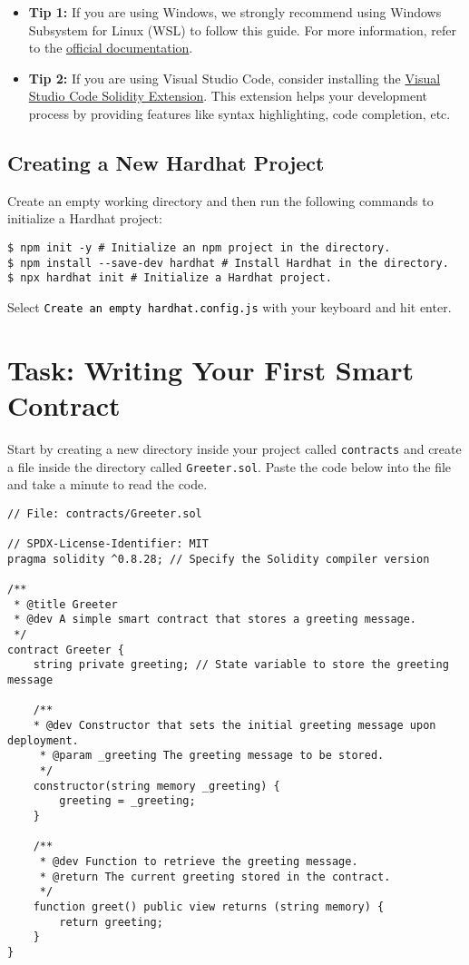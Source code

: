 \documentclass[12pt]{article}
\newcommand{\codegrey}[1]{%
  \texttt{\colorbox{black!4}{\textcolor{black}{#1}}}%
}
\begin{document}
\begin{itemize}
    \item \textbf{Tip 1:} If you are using Windows, we strongly recommend using Windows Subsystem for Linux (WSL) to follow this guide. For more information, refer to the \href{https://learn.microsoft.com/en-us/windows/wsl/about}{official documentation}.
    
    \item \textbf{Tip 2:} If you are using Visual Studio Code, consider installing the \href{https://marketplace.visualstudio.com/items?itemName=JuanBlanco.solidity}{Visual Studio Code Solidity Extension}. This extension helps your development process by providing features like syntax highlighting, code completion, etc.
\end{itemize}

\subsection{Creating a New Hardhat Project}

Create an empty working directory and then run the following commands to initialize a Hardhat project:

\begin{verbatim}
$ npm init -y # Initialize an npm project in the directory.
$ npm install --save-dev hardhat # Install Hardhat in the directory.
$ npx hardhat init # Initialize a Hardhat project.
\end{verbatim}
Select \codegrey{Create an empty \texttt{hardhat.config.js}} with your keyboard and hit enter.

\section{Task: Writing Your First Smart Contract}

Start by creating a new directory inside your project called \texttt{contracts} and create a file inside the directory called \texttt{Greeter.sol}. Paste the code below into the file and take a minute to read the code.

\begin{lstlisting}[language=Solidity]
// File: contracts/Greeter.sol

// SPDX-License-Identifier: MIT
pragma solidity ^0.8.28; // Specify the Solidity compiler version

/**
 * @title Greeter
 * @dev A simple smart contract that stores a greeting message.
 */
contract Greeter {
    string private greeting; // State variable to store the greeting message

    /**
    * @dev Constructor that sets the initial greeting message upon deployment.
     * @param _greeting The greeting message to be stored.
     */
    constructor(string memory _greeting) {
        greeting = _greeting;
    }

    /**
     * @dev Function to retrieve the greeting message.
     * @return The current greeting stored in the contract.
     */
    function greet() public view returns (string memory) {
        return greeting;
    }
}
\end{lstlisting}
\end{document}
